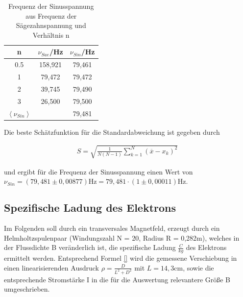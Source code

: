 \renewcommand{\arraystretch}{1.5}
\begin{table}[h]
 \centering
\begin{tabular}{c|c|c}
n & $\nu_{Sae}$/Hz & $\nu_{Sin}$/Hz\\
\hline
0.5 & 158,921 & 79,461 \\
1 & 79,472 & 79,472 \\
2 & 39,745 & 79,490 \\
3 & 26,500 & 79,500 \\
\hline
$\left< \nu_{Sin} \right>$ &   & 79,481\\
\end{tabular}
 \caption{Frequenz der Sinusspannung aus Frequenz der Sägezahnspannung und Verhältnis n}
\end{table}
\renewcommand{\arraystretch}{1}

Die beste Schätzfunktion für die Standardabweichung ist gegeben durch

\begin{align}
 S = \sqrt{\frac{1}{N(N-1)} \sum_{k=1}^N (\overline{x} - x_k)^2}
\end{align}

und ergibt für die Frequenz der Sinusspannung einen Wert von \newline
$\nu_{Sin} = (79,481 \pm 0,00877) \text{Hz} = 79,481 \cdot (1 \pm 0,00011) \text{Hz}$.

\subsection{Spezifische Ladung des Elektrons}
Im Folgenden soll durch ein transversales Magnetfeld, erzeugt durch ein Helmholtzspulenpaar (Windungszahl N = 20, Radius R = 0,282m), welches in der Flussdichte B 
veränderlich ist, die spezifische Ladung $\frac{C}{kg}$ des Elektrons ermittelt werden. Entsprechend Formel \eqref{} wird
die gemessene Verschiebung in einen linearisierenden Ausdruck $\rho = \frac{D}{L^2 + D^2}$ mit $L=14,3\text{cm}$, sowie die entsprechende
Stromstärke I in die für die Auswertung relevantere Größe B umgeschrieben.

